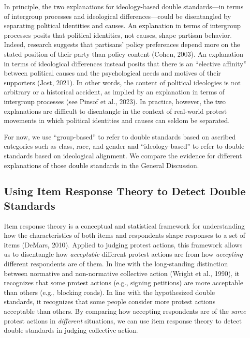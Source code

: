 \documentclass[12pt, letterpaper]{article}
\begin{document}
In principle, the two explanations for ideology-based double
standards---in terms of intergroup processes and ideological
differences---could be disentangled by separating political identities
and causes. An explanation in terms of intergroup processes posits that
political identities, not causes, shape partisan behavior. Indeed,
research suggests that partisans' policy preferences depend more on the
stated position of their party than policy content (Cohen, 2003). An
explanation in terms of ideological differences instead posits that
there is an ``elective affinity'' between political causes and the
psychological needs and motives of their supporters (Jost, 2021). In
other words, the content of political ideologies is not arbitrary or a
historical accident, as implied by an explanation in terms of intergroup
processes (see Pinsof et al., 2023). In practice, however, the two
explanations are difficult to disentangle in the context of real-world
protest movements in which political identities and causes can seldom be
separated.

For now, we use ``group-based'' to refer to double standards based on
ascribed categories such as class, race, and gender and
``ideology-based'' to refer to double standards based on ideological
alignment. We compare the evidence for different explanations of those
double standards in the General Discussion.

\hypertarget{using-item-response-theory-to-detect-double-standards}{%
\subsection{Using Item Response Theory to Detect Double
Standards}\label{using-item-response-theory-to-detect-double-standards}}

Item response theory is a conceptual and statistical framework for
understanding how the characteristics of both items and respondents
shape responses to a set of items (DeMars, 2010). Applied to judging
protest actions, this framework allows us to disentangle how
\emph{acceptable} different protest actions are from how
\emph{accepting} different respondents are of them. In line with the
long-standing distinction between normative and non-normative collective
action (Wright et al., 1990), it recognizes that some protest actions
(e.g., signing petitions) are more acceptable than others (e.g.,
blocking roads). In line with the hypothesized double standards, it
recognizes that some people consider more protest actions acceptable
than others. By comparing how accepting respondents are of the
\emph{same} protest actions in \emph{different} situations, we can use
item response theory to detect double standards in judging collective
action.
\end{document}
